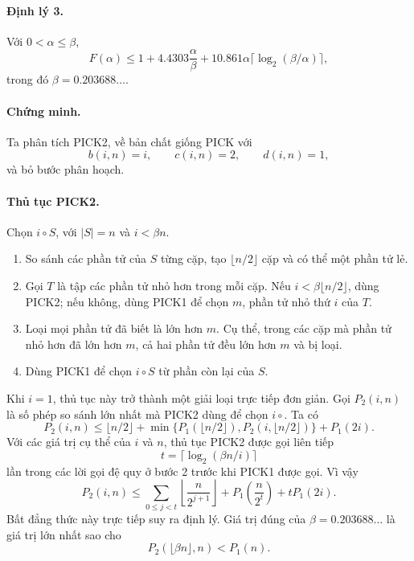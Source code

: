 \documentclass[11pt]{article}
\newcommand{\PICK}{\textsc{PICK}}
\newcommand{\PICKone}{\textsc{PICK1}}
\newcommand{\PICKtwo}{\textsc{PICK2}}
\begin{document}
\paragraph{Định lý 3.}
Với \(0<\alpha\le\beta\),
\[
  F(\alpha)\le
  1+4.4303\frac{\alpha}{\beta}
  +10.861\alpha\lceil\log_2(\beta/\alpha)\rceil,
  \tag{17}
\]
trong đó \(\beta=0.203688\ldots\).

\paragraph{Chứng minh.}
Ta phân tích \PICKtwo, về bản chất giống \PICK{} với
\[
  b(i,n)=i,\qquad c(i,n)=2,\qquad d(i,n)=1,
\]
và bỏ bước phân hoạch.

\paragraph{Thủ tục \PICKtwo.}
Chọn \(i\circ S\), với \(|S|=n\) và \(i<\beta n\).

\begin{enumerate}
  \item So sánh các phần tử của \(S\) từng cặp, tạo \(\lfloor n/2\rfloor\)
  cặp và có thể một phần tử lẻ.
  \item Gọi \(T\) là tập các phần tử nhỏ hơn trong mỗi cặp. Nếu
  \(i<\beta\lfloor n/2\rfloor\), dùng \PICKtwo; nếu không, dùng \PICKone{} để
  chọn \(m\), phần tử nhỏ thứ \(i\) của \(T\).
  \item Loại mọi phần tử đã biết là lớn hơn \(m\). Cụ thể, trong các cặp mà
  phần tử nhỏ hơn đã lớn hơn \(m\), cả hai phần tử đều lớn hơn \(m\) và bị
  loại.
  \item Dùng \PICKone{} để chọn \(i\circ S\) từ phần còn lại của \(S\).
\end{enumerate}

Khi \(i=1\), thủ tục này trở thành một giải loại trực tiếp đơn giản. Gọi
\(P_2(i,n)\) là số phép so sánh lớn nhất mà \PICKtwo{} dùng để chọn \(i\circ\).
Ta có
\[
  P_2(i,n)\le
  \lfloor n/2\rfloor
  +\min\{P_1(\lfloor n/2\rfloor),P_2(i,\lfloor n/2\rfloor)\}
  +P_1(2i).
  \tag{18}
\]
Với các giá trị cụ thể của \(i\) và \(n\), thủ tục \PICKtwo{} được gọi liên
tiếp
\[
  t=\lceil\log_2(\beta n/i)\rceil
\]
lần trong các lời gọi đệ quy ở bước 2 trước khi \PICKone{} được gọi. Vì vậy
\[
  P_2(i,n)\le
  \sum_{0\le j<t}\left\lfloor\frac{n}{2^{j+1}}\right\rfloor
  +P_1\!\left(\frac{n}{2^t}\right)
  +tP_1(2i).
  \tag{19}
\]
Bất đẳng thức này trực tiếp suy ra định lý. Giá trị đúng của
\(\beta=0.203688\ldots\) là giá trị lớn nhất sao cho
\[
  P_2(\lfloor\beta n\rfloor,n)<P_1(n).
\]
\end{document}
